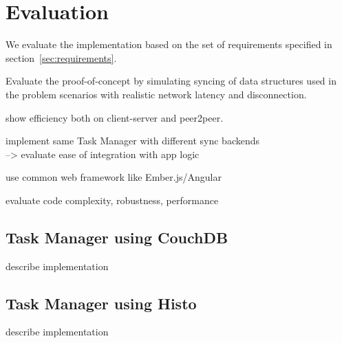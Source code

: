 
\chapter{Evaluation}\label{evaluation}

We evaluate the implementation based on the set of requirements specified in section~\ref{sec:requirements}.

Evaluate the proof-of-concept by simulating syncing of data structures
used in the problem scenarios with realistic network latency and
disconnection.

show efficiency both on client-server and peer2peer.

implement same Task Manager with different sync backends\\
--> evaluate ease of integration with app logic

use common web framework like Ember.js/Angular

evaluate code complexity, robustness, performance

\section{Task Manager using CouchDB}

describe implementation

\section{Task Manager using Histo}

describe implementation
